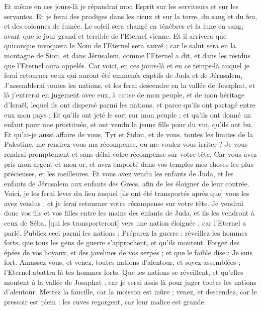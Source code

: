 \begin{multicols}{2}
Et même en ces jours-là je répandrai mon Esprit sur les serviteurs et sur les servantes.
Et je ferai des prodiges dans les cieux et sur la terre, du sang et du feu, et des colonnes de fumée.
Le soleil sera changé en ténèbres et la lune en sang, avant que le jour grand et terrible de l'Eternel vienne.
Et il arrivera que quiconque invoquera le Nom de l'Eternel sera sauvé ; car le salut sera en la montagne de Sion, et dans Jérusalem, comme l'Eternel a dit, et dans les résidus que l'Eternel aura appelés.
\VerseOne{}Car voici, en ces jours-là et en ce temps-là auquel je ferai retourner ceux qui auront été emmenés captifs de Juda et de Jérusalem,
J'assemblerai toutes les nations, et les ferai descendre en la vallée de Josaphat, et là j'entrerai en jugement avec eux, à cause de mon peuple, et de mon héritage d'Israël, lequel ils ont dispersé parmi les nations, et parce qu'ils ont partagé entre eux mon pays ;
Et qu'ils ont jeté le sort sur mon peuple ; et qu'ils ont donné un enfant pour une prostituée, et ont vendu la jeune fille pour du vin, qu'ils ont bu.
Et qu'ai-je aussi affaire de vous, Tyr et Sidon, et de vous, toutes les limites de la Palestine, me rendrez-vous ma récompense, ou me voulez-vous irriter ? Je vous rendrai promptement et sans délai votre récompense sur votre tête.
Car vous avez pris mon argent et mon or, et avez emporté dans vos temples mes choses les plus précieuses, et les meilleures.
Et vous avez vendu les enfants de Juda, et les enfants de Jérusalem aux enfants des Grecs, afin de les éloigner de leur contrée.
Voici, je les ferai lever du lieu auquel [ils ont été transportés après que] vous les avez vendus ; et je ferai retourner votre récompense sur votre tête.
Je vendrai donc vos fils et vos filles entre les mains des enfants de Juda, et ils les vendront à ceux de Séba, [qui les transporteront] vers une nation éloignée ; car l'Eternel a parlé.
Publiez ceci parmi les nations : Préparez la guerre ; réveillez les hommes forts, que tous les gens de guerre s'approchent, et qu'ils montent.
Forgez des épées de vos hoyaux, et des javelines de vos serpes ; et que le faible dise : Je suis fort.
Amassez-vous, et venez, toutes nations d'alentour, et soyez assemblées ; l'Eternel abattra là tes hommes forts.
Que les nations se réveillent, et qu'elles montent à la vallée de Josaphat ; car je serai assis là pour juger toutes les nations d'alentour.
Mettez la faucille, car la moisson est mûre ; venez, et descendez, car le pressoir est plein : les cuves regorgent, car leur malice est grande.

\end{multicols}
